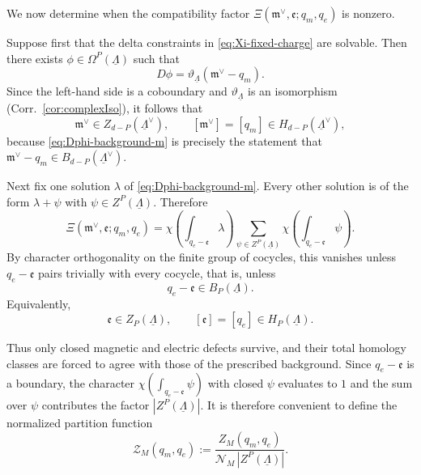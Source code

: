 \documentclass[dvipsnames,a4paper]{article}
\numberwithin{equation}{section}
\theoremstyle{definition}
\theoremstyle{remark}
\begin{document}
We now determine when the compatibility factor
\(\Xi(\mathfrak m^\vee,\mathfrak e;q_m,q_e)\) is nonzero.

Suppose first that the delta constraints in \eqref{eq:Xi-fixed-charge} are solvable. Then
there exists \(\phi\in \Omega^P(\underline\Lambda)\) such that
\begin{equation}
	D\phi=\vartheta_{\underline\Lambda}(\mathfrak m^\vee-q_m).
	\label{eq:Dphi-background-m}
\end{equation}
Since the left-hand side is a coboundary and $\vartheta_{\underline\Lambda}$ is an isomorphism (Corr.~\ref{cor:complexIso}), it follows that
\begin{equation}
	\mathfrak m^\vee\in Z_{d-P}(\underline\Lambda^\vee),
	\qquad
	[\mathfrak m^\vee]=[q_m]\in H_{d-P}(\underline\Lambda^\vee),
	\label{eq:magnetic-homology-class}
\end{equation}
because \eqref{eq:Dphi-background-m} is precisely the statement that
\(\mathfrak m^\vee-q_m\in B_{d-P}(\underline\Lambda^\vee)\).

Next fix one solution \(\lambda\) of \eqref{eq:Dphi-background-m}. Every other solution is
of the form \(\lambda+\psi\) with \(\psi\in Z^P(\underline\Lambda)\). Therefore
\begin{equation}
	\Xi(\mathfrak m^\vee,\mathfrak e;q_m,q_e)
	=
	\chi \left(\int_{q_e-\mathfrak e}\lambda\right)
	\sum_{\psi\in Z^P(\underline\Lambda)}
	\chi \left(\int_{q_e-\mathfrak e}\psi\right).
	\label{eq:Xi-affine-flat-sum}
\end{equation}
By character orthogonality on the finite group of cocycles, this vanishes unless
\(q_e-\mathfrak e\) pairs trivially with every cocycle, that is, unless
\begin{equation}
	q_e-\mathfrak e\in B_P(\underline\Lambda).
\end{equation}
Equivalently,
\begin{equation}
	\mathfrak e\in Z_P(\underline\Lambda),
	\qquad
	[\mathfrak e]=[q_e]\in H_P(\underline\Lambda).
	\label{eq:electric-homology-class}
\end{equation}

Thus only closed magnetic and electric defects survive, and their total homology classes are
forced to agree with those of the prescribed background. Since $q_e-\mathfrak e$ is a boundary, the character $\chi\left(\int_{q_e-\mathfrak e}\psi\right)$ with closed $\psi$ evaluates to $1$ and the sum over $\psi$ contributes the factor \(|Z^P(\underline\Lambda)|\). It is therefore convenient to define the normalized partition function
\begin{equation}
	\mathcal Z_M(q_m,q_e)
	:=
	\frac{Z_M(q_m,q_e)}
	{\mathcal N_M\,|Z^P(\underline\Lambda)|}.
	\label{eq:normalized-closed-defect-gas}
\end{equation}
\end{document}
